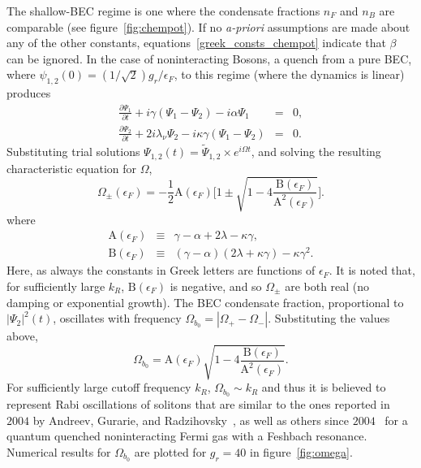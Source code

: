 \documentclass[a4paper,10pt]{article}
\begin{document}
The shallow-BEC regime is one where the condensate fractions $n_F$ and $n_B$ are comparable (see figure~\ref{fig:chempot}). If no \emph{a-priori} assumptions are made about any of the other constants, equations~\ref{greek_consts_chempot} indicate that $\beta$ can be ignored. In the case of noninteracting Bosons, a quench from a pure BEC, where $\psi_{1,2}(0) = \left(1/\sqrt{2} \right)g_r/\epsilon_F$, to this regime (where the dynamics is linear) produces \begin{eqnarray}
\label{dynamical_system_nobeta}
\frac{\partial\Psi_1}{\partial t}+ i\gamma \left( \Psi_1-\Psi_2 \right) - i\alpha \Psi_1 &=& 0, \nonumber \\
\frac{\partial\Psi_2}{\partial t} +2i\lambda_\nu\Psi_2 - i\kappa\gamma \left(\Psi_1-\Psi_2 \right) &=& 0.
\end{eqnarray}
Substituting trial solutions $\Psi_{1,2}(t) = \tilde{\Psi}_{1,2} \times e^{i\Omega t}$, and solving the  resulting characteristic equation for $\Omega$,  
\begin{equation}
\label{omegapm}
\Omega_\pm\left(\epsilon_F \right) = -\frac{1}{2} {\mathrm A}\left(\epsilon_F\right) \bigg[ 1 \pm \sqrt{1-4\frac{{\mathrm B}\left(\epsilon_F\right)}{{\mathrm A}^2\left(\epsilon_F\right)}}\bigg]. 
\end{equation}
where
\begin{eqnarray}
\label{AB}
{\mathrm A}\left(\epsilon_F\right) &\equiv& \gamma -\alpha +2\lambda -\kappa\gamma , \nonumber \\
{\mathrm B}\left(\epsilon_F\right) &\equiv& \left(\gamma-\alpha \right)\left(2\lambda+\kappa\gamma \right)-\kappa\gamma^2.                                                                      
\end{eqnarray}
Here, as always the constants in Greek letters are functions of $\epsilon_F$. It is noted that, for sufficiently large $k_R$, $\mathrm{B}(\epsilon_F)$ is negative, and so $\Omega_\pm$ are both real (no damping or exponential growth). The BEC condensate fraction,  proportional to $|\Psi_2|^2(t)$,  oscillates with frequency $\Omega_{b_0} = |\Omega_+ - \Omega_-|$. Substituting the values above, 
\begin{equation}
\Omega_{b_0} = {\mathrm A}\left(\epsilon_F\right)\sqrt{1-4\frac{{\mathrm B}\left(\epsilon_F\right)}{{\mathrm A}^2\left(\epsilon_F\right)}}.
\end{equation}
For sufficiently large cutoff frequency $k_R$, $\Omega_{b_0} \sim k_R$ and thus it is believed to represent Rabi oscillations of solitons that are similar to the ones reported in $2004$ by Andreev, Gurarie, and Radzihovsky~\cite{andreev:noneqmbcsbec}, as well as others since $2004$~\cite{barankov:bcsbecbloch,yuzbashyan2,miyakawa} for a quantum quenched noninteracting Fermi gas with a Feshbach resonance. Numerical results for $\Omega_{b_0}$ are plotted for $g_r=40$ in figure~\ref{fig:omega}. 
\end{document}

